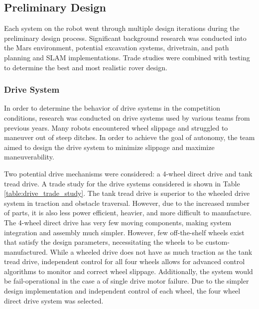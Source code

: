 \documentclass[class=article, crop=false]{standalone}
\begin{document}
	\subsection{Preliminary Design}
	\label{subsec:preliminary_design}
	Each system on the robot went through multiple design iterations during the preliminary design process. Significant background research was conducted into the Mars environment, potential excavation systems, drivetrain, and path planning and SLAM implementations. Trade studies were combined with testing to determine the best and most realistic rover design.
	\subsubsection{Drive System}
In order to determine the behavior of drive systems in the competition conditions, research was conducted on drive systems used by various teams from previous years. Many robots encountered wheel slippage and struggled to maneuver out of steep ditches. In order to achieve the goal of autonomy, the team aimed to design the drive system to minimize slippage and maximize maneuverability.

Two potential drive mechanisms were considered: a 4-wheel direct drive and tank tread drive. A trade study for the drive systems considered is shown in Table \ref{table:drive_trade_study}. The tank tread drive is superior to the wheeled drive system in traction and obstacle traversal. However, due to the increased number of parts, it is also less power efficient, heavier, and more difficult to manufacture. The 4-wheel direct drive has very few moving components, making system integration and assembly much simpler. However, few off-the-shelf wheels exist that satisfy the design parameters, necessitating the wheels to be custom-manufactured. While a wheeled drive does not have as much traction as the tank tread drive, independent control for all four wheels allows for advanced control algorithms to monitor and correct wheel slippage. Additionally, the system would be fail-operational in the case a of single drive motor failure. Due to the simpler design implementation and independent control of each wheel, the four wheel direct drive system was selected.
\end{document}
